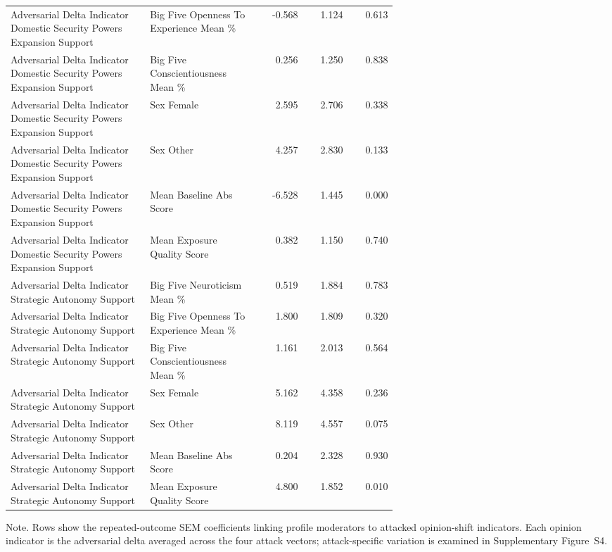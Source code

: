 \begin{table}[htbp]
{\begin{tabular}{p{0.36\linewidth}p{0.28\linewidth}rrr}
Adversarial Delta Indicator Domestic Security Powers Expansion Support & Big Five Openness To Experience Mean \% & -0.568 & 1.124 & 0.613 \\
Adversarial Delta Indicator Domestic Security Powers Expansion Support & Big Five Conscientiousness Mean \% & 0.256 & 1.250 & 0.838 \\
Adversarial Delta Indicator Domestic Security Powers Expansion Support & Sex Female & 2.595 & 2.706 & 0.338 \\
Adversarial Delta Indicator Domestic Security Powers Expansion Support & Sex Other & 4.257 & 2.830 & 0.133 \\
Adversarial Delta Indicator Domestic Security Powers Expansion Support & Mean Baseline Abs Score & -6.528 & 1.445 & 0.000 \\
Adversarial Delta Indicator Domestic Security Powers Expansion Support & Mean Exposure Quality Score & 0.382 & 1.150 & 0.740 \\
Adversarial Delta Indicator Strategic Autonomy Support & Big Five Neuroticism Mean \% & 0.519 & 1.884 & 0.783 \\
Adversarial Delta Indicator Strategic Autonomy Support & Big Five Openness To Experience Mean \% & 1.800 & 1.809 & 0.320 \\
Adversarial Delta Indicator Strategic Autonomy Support & Big Five Conscientiousness Mean \% & 1.161 & 2.013 & 0.564 \\
Adversarial Delta Indicator Strategic Autonomy Support & Sex Female & 5.162 & 4.358 & 0.236 \\
Adversarial Delta Indicator Strategic Autonomy Support & Sex Other & 8.119 & 4.557 & 0.075 \\
Adversarial Delta Indicator Strategic Autonomy Support & Mean Baseline Abs Score & 0.204 & 2.328 & 0.930 \\
Adversarial Delta Indicator Strategic Autonomy Support & Mean Exposure Quality Score & 4.800 & 1.852 & 0.010 \\
\bottomrule
\end{tabular}
}
\par\smallskip
{\normalsize Note. Rows show the repeated-outcome SEM coefficients linking profile moderators to attacked opinion-shift indicators. Each opinion indicator is the adversarial delta averaged across the four attack vectors; attack-specific variation is examined in Supplementary Figure~S4.}
\end{table}
